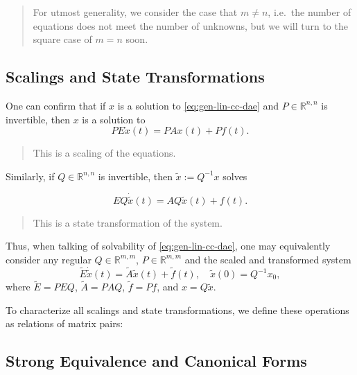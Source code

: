 \documentclass[]{book}
\newenvironment {JHSAYS} [0] {\begin{quote}\color{jhsc}} {\end{quote}}
\theoremstyle{definition}
\theoremstyle{definition}
\theoremstyle{definition}
\theoremstyle{definition}
\theoremstyle{remark}
\begin{document}
\begin{JHSAYS}
For utmost generality, we consider the case that \(m\neq n\), i.e.~the
number of equations does not meet the number of unknowns, but we will
turn to the square case of \(m=n\) soon.
\end{JHSAYS}

\hypertarget{scalings-and-state-transformations}{%
\subsection{Scalings and State Transformations}\label{scalings-and-state-transformations}}

One can confirm that if \(x\) is a solution to \eqref{eq:gen-lin-cc-dae} and \(P\in \mathbb R^{n,n}\) is invertible, then \(x\) is a solution to
\begin{equation*}
PE \dot x (t) = PAx(t) + Pf(t).
\end{equation*}

\begin{JHSAYS}
This is a scaling of the equations.
\end{JHSAYS}

Similarly, if \(Q\in \mathbb R^{n,n}\) is invertible, then \(\tilde x := Q^{-1}x\) solves

\begin{equation*}
E Q \dot {\tilde x} (t) = AQ \tilde x(t) + f(t).
\end{equation*}

\begin{JHSAYS}
This is a state transformation of the system.
\end{JHSAYS}

Thus, when talking of solvability of \eqref{eq:gen-lin-cc-dae}, one may equivalently consider any regular \(Q\in \mathbb R^{m,m}\), \(P\in \mathbb R^{m,m}\) and the scaled and transformed system
\begin{equation}
\tilde E \dot{\tilde x}(t) = \tilde A \tilde x (t) + \tilde f(t), \quad \tilde x(0) = Q^{-1}x_0,
\end{equation}
where \(\tilde E = PEQ\), \(\tilde A = PAQ\), \(\tilde f = Pf\), and \(x=Q\tilde x\).

To characterize all scalings and state transformations, we define these operations as relations of matrix pairs:

\hypertarget{strong-equivalence-and-canonical-forms}{%
\subsection{Strong Equivalence and Canonical Forms}\label{strong-equivalence-and-canonical-forms}}
\end{document}
